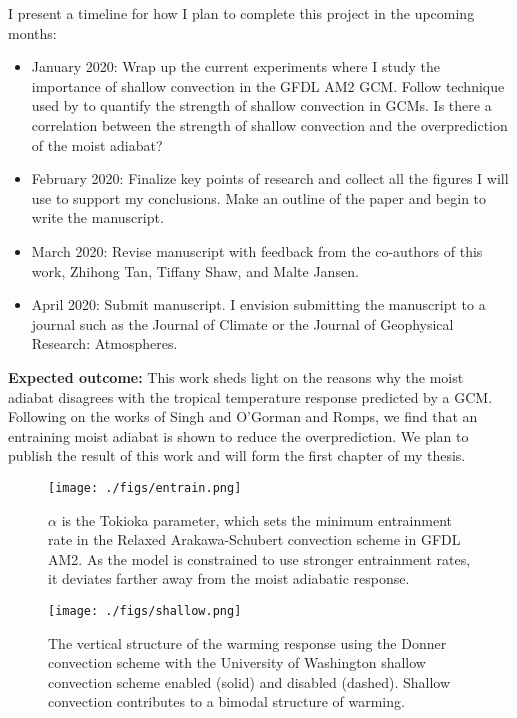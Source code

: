 \documentclass{article}
\begin{document}
I present a timeline for how I plan to complete this project in the upcoming months:
\begin{itemize}
\item January 2020: Wrap up the current experiments where I study the importance of shallow convection in the GFDL AM2 GCM. Follow technique used by \citet{sherwood-et-al-2014} to quantify the strength of shallow convection in GCMs. Is there a correlation between the strength of shallow convection and the overprediction of the moist adiabat? 
\item February 2020: Finalize key points of research and collect all the figures I will use to support my conclusions. Make an outline of the paper and begin to write the manuscript.
\item March 2020: Revise manuscript with feedback from the co-authors of this work, Zhihong Tan, Tiffany Shaw, and Malte Jansen.
\item April 2020: Submit manuscript. I envision submitting the manuscript to a journal such as the Journal of Climate or the Journal of Geophysical Research: Atmospheres.
\end{itemize}

\textbf{Expected outcome:} This work sheds light on the reasons why the moist adiabat disagrees with the tropical temperature response predicted by a GCM. Following on the works of Singh and O'Gorman and Romps, we find that an entraining moist adiabat is shown to reduce the overprediction. We plan to publish the result of this work and will form the first chapter of my thesis.

\begin{figure}
\centering
\texttt{[image: ./figs/entrain.png]}
\caption{$\alpha$ is the Tokioka parameter, which sets the minimum entrainment rate in the Relaxed Arakawa-Schubert convection scheme \citep{moorthi-suarez-1992} in GFDL AM2. As the model is constrained to use stronger entrainment rates, it deviates farther away from the moist adiabatic response.}
\label{fig:entrain}
\end{figure}

\begin{figure}
\centering
\texttt{[image: ./figs/shallow.png]}
\caption{The vertical structure of the warming response using the Donner convection scheme \citep{donner-et-al-2001} with the University of Washington shallow convection scheme \citep{park-bretherton-2009} enabled (solid) and disabled (dashed). Shallow convection contributes to a bimodal structure of warming.} 
\label{fig:shallow}
\end{figure}
\end{document}
